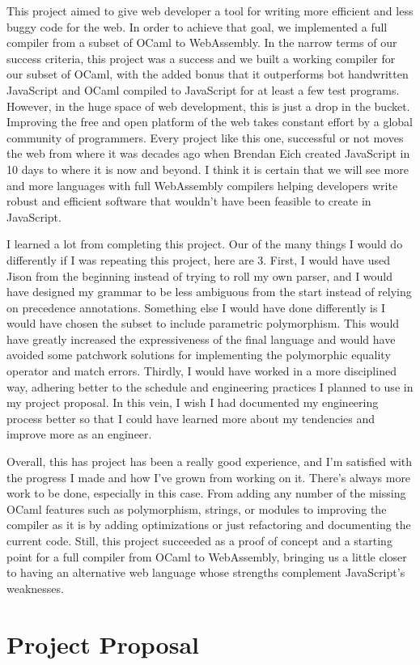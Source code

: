 \documentclass[12pt,a4paper,twoside,openright]{report}
\begin{document}
This project aimed to give web developer a tool for writing more efficient and less buggy code for the web.
In order to achieve that goal, we implemented a full compiler from a subset of OCaml to WebAssembly.
In the narrow terms of our success criteria, this project was a success and we built a working compiler for our subset of OCaml, with the added bonus that it outperforms bot handwritten JavaScript and OCaml compiled to JavaScript for at least a few test programs.
However, in the huge space of web development, this is just a drop in the bucket.
Improving the free and open platform of the web takes constant effort by a global community of programmers.
Every project like this one, successful or not moves the web from where it was decades ago when Brendan Eich created JavaScript in 10 days to where it is now and beyond.
I think it is certain that we will see more and more languages with full WebAssembly compilers helping developers write robust and efficient software that wouldn't have been feasible to create in JavaScript.

I learned a lot from completing this project.
Our of the many things I would do differently if I was repeating this project, here are 3.
First, I would have used Jison from the beginning instead of trying to roll my own parser, and I would have designed my grammar to be less ambiguous from the start instead of relying on precedence annotations.
Something else I would have done differently is I would have chosen the subset to include parametric polymorphism.
This would have greatly increased the expressiveness of the final language and would have avoided some patchwork solutions for implementing the polymorphic equality operator and match errors.
Thirdly, I would have worked in a more disciplined way, adhering better to the schedule and engineering practices I planned to use in my project proposal.
In this vein, I wish I had documented my engineering process better so that I could have learned more about my tendencies and improve more as an engineer.

Overall, this has project has been a really good experience, and I'm satisfied with the progress I made and how I've grown from working on it.
There's always more work to be done, especially in this case.
From adding any number of the missing OCaml features such as polymorphism, strings, or modules to improving the compiler as it is by adding optimizations or just refactoring and documenting the current code.
Still, this project succeeded as a proof of concept and a starting point for a full compiler from OCaml to WebAssembly, bringing us a little closer to having an alternative web language whose strengths complement JavaScript's weaknesses.



\appendix

\chapter{Project Proposal}


\end{document}

